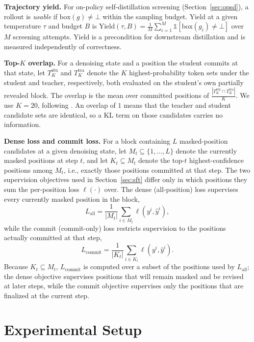 \documentclass{article}
\begin{document}
\textbf{Trajectory yield.} For on-policy self-distillation screening (Section~\ref{sec:opsd}), a rollout is \emph{usable} if $\mathrm{box}(g) \neq \bot$ within the sampling budget. Yield at a given temperature $\tau$ and budget $B$ is $\mathrm{Yield}(\tau, B) = \frac{1}{M}\sum_{i=1}^M \mathbb{1}[\mathrm{box}(g_i) \neq \bot]$ over $M$ screening attempts. Yield is a precondition for downstream distillation and is measured independently of correctness.

\textbf{Top-$K$ overlap.} For a denoising state and a position the student commits at that state, let $T^{\text{stu}}_K$ and $T^{\text{tea}}_K$ denote the $K$ highest-probability token sets under the student and teacher, respectively, both evaluated on the student's own partially revealed block. The overlap is the mean over committed positions of $\frac{|T^{\text{stu}}_K \cap T^{\text{tea}}_K|}{K}$. We use $K=20$, following \citet{dopsd2026}. An overlap of $1$ means that the teacher and student candidate sets are identical, so a KL term on those candidates carries no information.

\textbf{Dense loss and commit loss.} For a block containing $L$ masked-position candidates at a given denoising state, let $M_t \subseteq \{1, \dots, L\}$ denote the currently masked positions at step $t$, and let $K_t \subseteq M_t$ denote the top-$t$ highest-confidence positions among $M_t$, i.e., exactly those positions committed at that step. The two supervision objectives used in Section~\ref{sec:sft} differ only in which positions they sum the per-position loss $\ell(\cdot)$ over. The dense (all-position) loss supervises every currently masked position in the block,
\[
L_{\text{all}} = \frac{1}{|M_t|}\sum_{i \in M_t} \ell(y^i, \hat{y}^i),
\]
while the commit (commit-only) loss restricts supervision to the positions actually committed at that step,
\[
L_{\text{commit}} = \frac{1}{|K_t|}\sum_{i \in K_t} \ell(y^i, \hat{y}^i).
\]
Because $K_t \subseteq M_t$, $L_{\text{commit}}$ is computed over a subset of the positions used by $L_{\text{all}}$; the dense objective supervises positions that will remain masked and be revised at later steps, while the commit objective supervises only the positions that are finalized at the current step.

\section{Experimental Setup}
\label{sec:setup}
\end{document}
